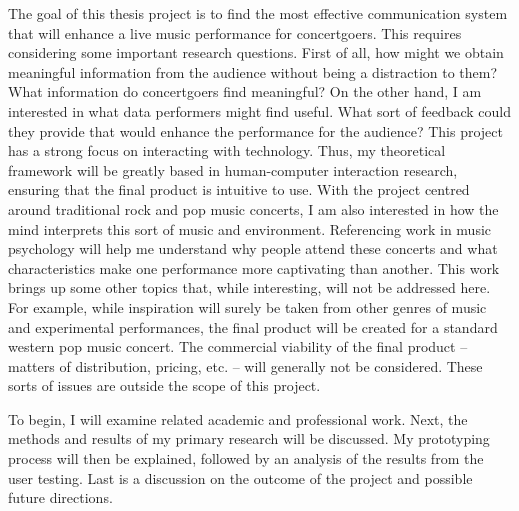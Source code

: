 
The goal of this thesis project is to find the most effective communication system that will enhance a live music performance for concertgoers. This requires considering some important research questions. First of all, how might we obtain meaningful information from the audience without being a distraction to them? What information do concertgoers find meaningful? On the other hand, I am interested in what data performers might find useful. What sort of feedback could they provide that would enhance the performance for the audience? This project has a strong focus on interacting with technology. Thus, my theoretical framework will be greatly based in human-computer interaction research, ensuring that the final product is intuitive to use. With the project centred around traditional rock and pop music concerts, I am also interested in how the mind interprets this sort of music and environment. Referencing work in music psychology will help me understand why people attend these concerts and what characteristics make one performance more captivating than another. This work brings up some other topics that, while interesting, will not be addressed here. For example, while inspiration will surely be taken from other genres of music and experimental performances, the final product will be created for a standard western pop music concert. The commercial viability of the final product -- matters of distribution, pricing, etc. -- will generally not be considered.  These sorts of issues are outside the scope of this project.

To begin, I will examine related academic and professional work. Next, the methods and results of my primary research will be discussed. My prototyping process will then be explained, followed by an analysis of the results from the user testing. Last is a discussion on the outcome of the project and possible future directions.